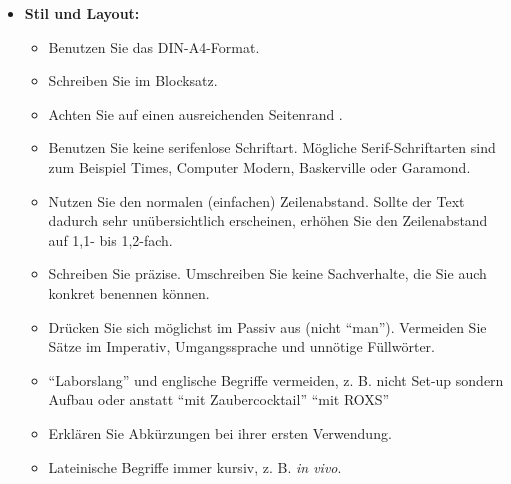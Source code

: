 \begin{itemize}
\item \textbf{Stil und Layout:}\begin{itemize}
	\item Benutzen Sie das DIN-A4-Format.
	\item Schreiben Sie im Blocksatz.
	\item Achten Sie auf einen ausreichenden Seitenrand .
	\item Benutzen Sie keine serifenlose Schriftart. Mögliche Serif-Schriftarten sind zum Beispiel Times, Computer Modern, Baskerville oder Garamond.
	\item Nutzen Sie den normalen (einfachen) Zeilenabstand. Sollte der Text dadurch sehr unübersichtlich erscheinen, erhöhen Sie den Zeilenabstand auf 1,1- bis 1,2-fach.
	\item Schreiben Sie präzise. Umschreiben Sie keine Sachverhalte, die Sie auch konkret benennen können.
	\item Drücken Sie sich möglichst im Passiv aus (nicht "`man"'). Vermeiden Sie Sätze im Imperativ, Umgangssprache und unnötige Füllwörter.
	\item "`Laborslang"' und englische Begriffe vermeiden, z. B. nicht Set-up sondern Aufbau oder anstatt "`mit Zaubercocktail"' "`mit ROXS"'
	\item Erklären Sie Abkürzungen bei ihrer ersten Verwendung.
	\item Lateinische Begriffe immer kursiv, z. B. \textit{in vivo}.
	\end{itemize}


\end{itemize}
